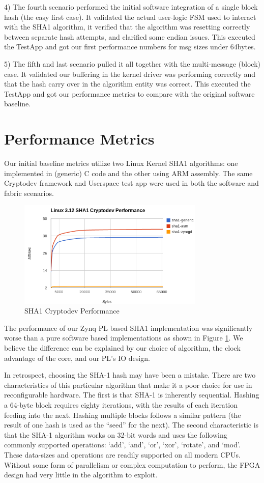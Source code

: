 \documentclass[journal]{IEEEtran}
\begin{document}
4) The fourth scenario performed the initial software integration of a single block hash (the easy first case).  It validated the actual user-logic FSM used to interact with the SHA1 algorithm, it verified that the algorithm was resetting correctly between separate hash attempts, and clarified some endian issues.  This executed the TestApp and got our first performance numbers for msg sizes under 64bytes.

5) The fifth and last scenario pulled it all together with the multi-message (block) case.  It validated our buffering in the kernel driver was performing correctly and that the hash carry over in the algorithm entity was correct.   This executed the TestApp and got our performance metrics to compare with the original software baseline.

\section{Performance Metrics}
Our initial baseline metrics utilize two Linux Kernel SHA1 algorithms: one implemented in (generic) C code and the other using ARM assembly.  The same Cryptodev framework and Userspace test app were used in both the software and fabric scenarios.

\begin{figure}[ht]
\centering
\includegraphics[width=3.5in]{perf.png}
\caption{SHA1 Cryptodev Performance}
\label{fig_algoPerf}
\end{figure} 

The performance of our Zynq PL based SHA1 implementation was significantly worse than a pure software based implementations as shown in Figure \ref{fig_algoPerf}. We believe the difference can be explained by our choice of algorithm, the clock advantage of the core, and our PL’s IO design. 

In retrospect, choosing the SHA-1 hash may have been a mistake.  There are two characteristics of this particular algorithm that make it a poor choice for use in reconfigurable hardware.  The first is that SHA-1 is inherently sequential.  Hashing a 64-byte block requires eighty iterations, with the results of each iteration feeding into the next.  Hashing multiple blocks follows a similar pattern (the result of one hash is used as the “seed” for the next).  The second characteristic is that the SHA-1 algorithm works on 32-bit words and uses the following commonly supported operations: ‘add’, ‘and’, ‘or’, ‘xor’, ‘rotate’, and ‘mod’. These data-sizes and operations are readily supported on all modern CPUs.  Without some form of parallelism or complex computation to perform, the FPGA design had very little in the algorithm to exploit.
\end{document}
